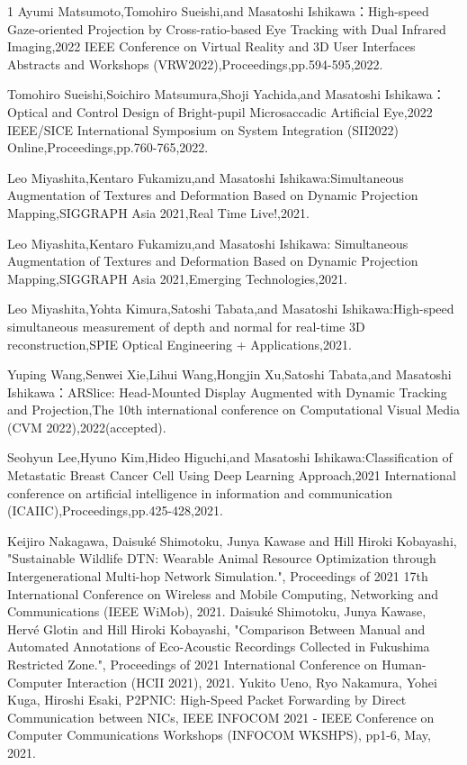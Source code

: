 \begin{査読付}{1}
Ayumi Matsumoto,Tomohiro Sueishi,and Masatoshi Ishikawa：High-speed Gaze-oriented Projection by Cross-ratio-based Eye Tracking with Dual Infrared Imaging,2022 IEEE Conference on Virtual Reality and 3D User Interfaces Abstracts and Workshops (VRW2022),Proceedings,pp.594-595,2022.

Tomohiro Sueishi,Soichiro Matsumura,Shoji Yachida,and Masatoshi Ishikawa： Optical and Control Design of Bright-pupil Microsaccadic Artificial Eye,2022 IEEE/SICE International Symposium on System Integration (SII2022) Online,Proceedings,pp.760-765,2022.

Leo Miyashita,Kentaro Fukamizu,and Masatoshi Ishikawa:Simultaneous Augmentation of Textures and Deformation Based on Dynamic Projection Mapping,SIGGRAPH Asia 2021,Real Time Live!,2021.

Leo Miyashita,Kentaro Fukamizu,and Masatoshi Ishikawa: Simultaneous Augmentation of Textures and Deformation Based on Dynamic Projection Mapping,SIGGRAPH Asia 2021,Emerging Technologies,2021.

Leo Miyashita,Yohta Kimura,Satoshi Tabata,and Masatoshi Ishikawa:High-speed simultaneous measurement of depth and normal for real-time 3D reconstruction,SPIE Optical Engineering + Applications,2021.

Yuping Wang,Senwei Xie,Lihui Wang,Hongjin Xu,Satoshi Tabata,and Masatoshi Ishikawa：ARSlice: Head-Mounted Display Augmented with Dynamic Tracking and Projection,The 10th international conference on Computational Visual Media (CVM 2022),2022(accepted).

Seohyun Lee,Hyuno Kim,Hideo Higuchi,and Masatoshi Ishikawa:Classification of Metastatic Breast Cancer Cell Using Deep Learning Approach,2021 International conference on artificial intelligence in information and communication (ICAIIC),Proceedings,pp.425-428,2021.

Keijiro Nakagawa, Daisuk\'e Shimotoku, Junya Kawase and Hill Hiroki Kobayashi, "Sustainable Wildlife DTN: Wearable Animal Resource Optimization through Intergenerational Multi-hop Network Simulation.", Proceedings of 2021 17th International Conference on Wireless and Mobile Computing, Networking and Communications (IEEE WiMob), 2021.
Daisuk\'e Shimotoku, Junya Kawase, Herv\'e Glotin and Hill Hiroki Kobayashi, "Comparison Between Manual and Automated Annotations of Eco-Acoustic Recordings Collected in Fukushima Restricted Zone.", Proceedings of 2021 International Conference on Human-Computer Interaction (HCII 2021), 2021.  
Yukito Ueno, Ryo Nakamura, Yohei Kuga, Hiroshi Esaki, P2PNIC: High-Speed Packet Forwarding by Direct Communication between NICs, IEEE INFOCOM 2021 - IEEE Conference on Computer Communications Workshops (INFOCOM WKSHPS), pp1-6, May, 2021.


\end{査読付}

